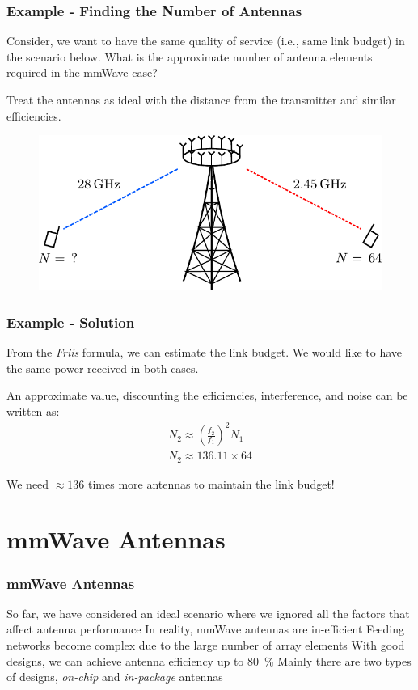 \documentclass[10pt]{beamer}
\begin{document}
\begin{frame}
    \frametitle{Example - Finding the Number of Antennas}
    Consider, we want to have the same quality of service (i.e., same link budget) in the scenario below. What is the approximate number of antenna elements required in the mmWave case?

    Treat the antennas as ideal with the distance from the transmitter and similar efficiencies.

    \begin{figure}[h!]
        \centering
        \includegraphics[width=.75\textwidth]{example_antenna.pdf}
    \end{figure}
\end{frame}

\begin{frame}
    \frametitle{Example - Solution}

    From the \textit{Friis} formula, we can estimate the link budget. We would like to have the same power received in both cases.

    An approximate value, discounting the efficiencies, interference, and noise can be written as:
    \begin{align*}
        N_2 \approx \left(\frac{f_2}{f_1}\right)^2 N_1 \\
        N_2 \approx 136.11 \times 64
    \end{align*}

    We need $\approx 136$ times more antennas to maintain the link budget!
\end{frame}

\section{mmWave Antennas}

\begin{frame}
    \frametitle{mmWave Antennas}

    \begin{outline}
        \1 So far, we have considered an ideal scenario where we ignored all the factors that affect antenna performance
        \2 In reality, mmWave antennas are in-efficient
        \2 Feeding networks become complex due to the large number of array elements
        \1 With good designs, we can achieve antenna efficiency up to \SI{80}{\percent}
        \1 Mainly there are two types of designs, \textit{on-chip} and \textit{in-package} antennas
    \end{outline}
\end{frame}
\end{document}

